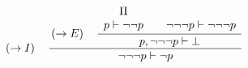 \documentclass{standalone}
\begin{document}
$
\left(\rightarrow{}I\right)\quad
\cfrac{
  \left(\rightarrow{}E\right)\quad
  \cfrac{
    \begin{array}{c}\Pi\\p\vdash\lnot\lnot{}p\end{array}
    \quad
    \begin{array}{c}\\\lnot\lnot\lnot{}p\vdash\lnot\lnot\lnot{}p\end{array}
  }{
    p,\lnot\lnot\lnot{}p\vdash\bot
  }
}{
  \lnot\lnot\lnot{}p\vdash\lnot{}p
}
$
\end{document}
